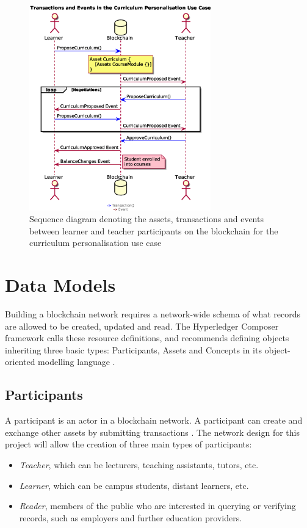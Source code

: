 \begin{figure}[!ht]
	\centering
	\includegraphics[width=0.7\textwidth]{personalisationloop}
	\caption[Curriculum Personalisation Use Case]
	{Sequence diagram denoting the assets, transactions and events between
		learner and teacher participants on the blockchain for the curriculum personalisation use case}
	\label{fig:personalisationloop}
\end{figure}



\section{Data Models}

Building a blockchain network requires a network-wide schema of what records are allowed to be created, updated and read.
The Hyperledger Composer framework calls these resource definitions, and recommends defining objects
inheriting three basic types: Participants, Assets and Concepts in its object-oriented modelling language
\citep{official2018composer}.

\subsection{Participants}

A participant is an actor in a blockchain network. A participant can create and exchange other assets
by submitting transactions \citep{official2018composer}.
The network design for this project will allow the creation of three main types of participants:
\begin{itemize}
	\setlength\itemsep{0em}
	\item \textit{Teacher}, which can be lecturers, teaching assistants, tutors, etc.
	\item \textit{Learner}, which can be campus students, distant learners, etc.
	\item \textit{Reader}, members of the public who are interested in querying or verifying records,
	      such as employers and further education providers.
\end{itemize}

